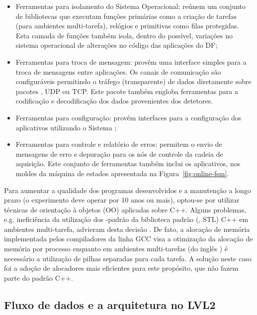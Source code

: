 \begin{itemize}
\item Ferramentas para isolamento do Sistema Operacional: reúnem um
conjunto de bibliotecas que executam funções primárias como a criação de
tarefas (para ambientes multi-tarefa), relógios e primitivas como filas
protegidas. Esta camada de funções também isola, dentro do possível, variações
no sistema operacional de alterações no código das aplicações do DF;

\item Ferramentas para troca de mensagem: provêm uma interface simples para a
troca de mensagens entre aplicações. Os canais de comunicação são
configuráveis permitindo o tráfego (transparente) de dados diretamente sobre
pacotes , UDP ou TCP. Este pacote também engloba ferramentas
para a codificação e decodificação dos dados provenientes dos detetores.

\item Ferramentas para configuração: provêm interfaces para a configuração dos
aplicativos utilizando o Sistema ;

\item Ferramentas para controle e relatório de erros: permitem o envio de
mensagens de erro e depuração para os nós de controle da cadeia de
aquisição. Este conjunto de ferramentas também inclui os aplicativos, nos
moldes da máquina de estados apresentada na Figura~\ref{fig:online-fsm}.
\end{itemize}

Para aumentar a qualidade dos programas desenvolvidos e a manutenção a longo
prazo (o experimento deve operar por 10 anos ou mais), optou-se por utilizar
técnicas de orientação à objetos (OO) aplicadas sobre C++. Alguns problemas,
e.g. ineficiência da utilização dos -padrão da biblioteca
padrão (, STL) C++ em ambientes multi-tarefa,
advieram desta decisão \cite{aa:chep-2003}. De fato, a alocação de memória
implementada pelos compiladores da linha GCC \cite{web:gcc, web:gcc-stl} visa
a otimização da alocação de memória por processo enquanto em ambientes
multi-tarefas (do inglês ) é necessário a utilização de
pilhas separadas para cada tarefa. A solução neste caso foi a adoção de
alocadores mais eficientes para este propósito, que não fazem parte do padrão
C++.

\subsection{Fluxo de dados e a arquitetura no LVL2}
\label{sec:lvl2arch}


